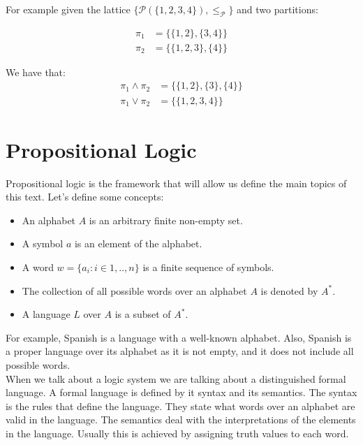 For example given the lattice $\{\mathcal{P}(\{1,2,3,4\}),\le_{\mathcal{P}}\}$ and two partitions:

\begin{equation}
    \begin{split}
      \pi_1 & = \{\{1,2\},\{3,4\}\}\\
      \pi_2 & = \{\{1,2,3\},\{4\}\}
\end{split}
\end{equation}

We have that:
\begin{equation}
    \begin{split}
      \pi_1\land\pi_2 & = \{\{1,2\},\{3\},\{4\}\}\\
      \pi_1\lor\pi_2 & = \{\{1,2,3,4\}\}
\end{split}
\end{equation}

  
\section{Propositional Logic}
Propositional logic is the framework that will allow us define the main topics of this text.  Let's define some concepts:
\begin{itemize}
\item An alphabet $A$ is an arbitrary finite non-empty set.
\item A symbol $a$ is an element of the alphabet.
\item A word $w = \{a_i:i\in 1,..,n\}$ is a finite sequence of symbols.
\item The collection of all possible words over an alphabet $A$ is denoted by $A^*$.
\item A language $L$ over $A$ is a subset of $A^*$.
\end{itemize}

For example, Spanish is a language with a well-known alphabet. Also, Spanish is a proper language over its alphabet as it is not empty, and it does not include all possible words.\\

When we talk about a logic system we are talking about a distinguished formal language. A formal language is defined by it syntax and its semantics. The syntax is the rules that define the language. They state what words over an alphabet are valid in the language. The semantics deal with the interpretations of the elements in the language. Usually this is achieved by assigning truth values to each word.\\

